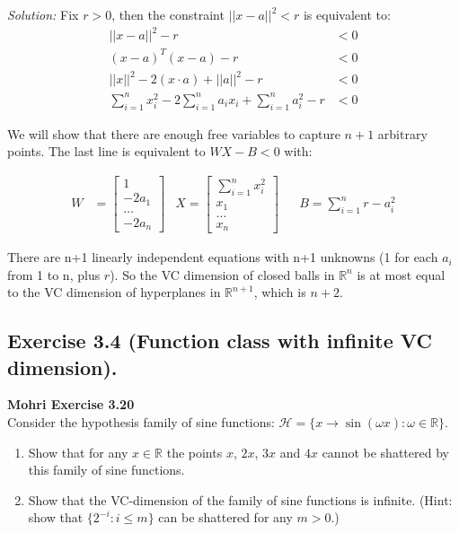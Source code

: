 \documentclass[
	10pt, %
	a4paper, %
	oneside, %
	headinclude,footinclude, %
	BCOR5mm, %
]{scrartcl}
\newenvironment{problem}[2][]
{ \begin{mdframed}[backgroundcolor=gray!20] \textbf{#1 #2} \\}
		{  \end{mdframed}}
\newenvironment{solution}
{\textit{Solution:}}
{}
\begin{document}
\begin{solution}
	Fix $r>0$, then the constraint $||x-a||^2<r$ is equivalent to:
	\begin{align*}
		||x-a||^2 - r                                                        & < 0 \\
		{(x-a)}^T(x-a) - r                                                   & < 0 \\
		||x||^2 - 2(x\cdot a) + ||a||^2 - r                                  & < 0 \\
		\sum_{i=1}^n x_i^2 - 2 \sum_{i=1}^n a_i x_i + \sum_{i=1}^n a_i^2 - r & < 0
	\end{align*}
\end{solution}

We will show that there are enough free variables to capture $n+1$ arbitrary points. The last line is equivalent to $WX - B < 0$ with:

\begin{align*}
	W & = \begin{bmatrix}
		      1      \\
		      -2a_1  \\
		      \ldots \\
		      -2a_n
	      \end{bmatrix} & X = \begin{bmatrix}
		                          \sum_{i=1}^n x_i^2 \\
		                          x_1                \\
		                          \ldots             \\
		                          x_n
	                          \end{bmatrix} &  & B = \sum_{i=1}^n r - a_i^2
\end{align*}

There are n+1 linearly independent equations with n+1 unknowns (1 for each $a_i$ from 1 to n, plus $r$). So the VC dimension of closed balls in $\mathbb{R}^n$ is at most equal to the VC dimension of hyperplanes in $\mathbb{R}^{n+1}$, which is $n+2$.
\newpage
\subsection*{Exercise 3.4 (Function class with infinite VC dimension).}
\begin{problem}{Mohri Exercise 3.20}
Consider the hypothesis family of sine functions: $\mathcal{H} = \{x \to \sin(\omega x): \omega \in \mathbb{R}\}$.
\begin{enumerate}[label= (\alph*)]
	\item Show that for any $x \in \mathbb{R}$ the points $x$, $2x$, $3x$ and $4x$ cannot be shattered by this family of sine functions.
	\item Show that the VC-dimension of the family of sine functions is infinite. (Hint: show that $\{2^{-i}: i \leq m\}$ can be shattered for any $m > 0$.)
\end{enumerate}
\end{problem}
\end{document}
